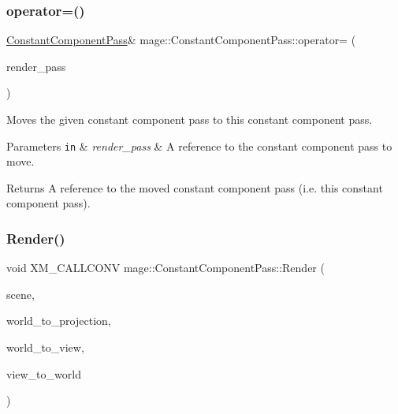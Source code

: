 \subsubsection{\texorpdfstring{operator=()}{operator=()}\hspace{0.1cm}{\footnotesize\ttfamily [2/2]}}
{\footnotesize\ttfamily \hyperlink{classmage_1_1_constant_component_pass}{Constant\+Component\+Pass}\& mage\+::\+Constant\+Component\+Pass\+::operator= (\begin{DoxyParamCaption}\item[{\hyperlink{classmage_1_1_constant_component_pass}{Constant\+Component\+Pass} \&\&}]{render\+\_\+pass }\end{DoxyParamCaption})\hspace{0.3cm}{\ttfamily [delete]}}

Moves the given constant component pass to this constant component pass.


\begin{DoxyParams}[1]{Parameters}
\mbox{\tt in}  & {\em render\+\_\+pass} & A reference to the constant component pass to move. \\
\hline
\end{DoxyParams}
\begin{DoxyReturn}{Returns}
A reference to the moved constant component pass (i.\+e. this constant component pass). 
\end{DoxyReturn}
\hypertarget{classmage_1_1_constant_component_pass_a8650124f2a85ab18e56d2058305ad008}{}\label{classmage_1_1_constant_component_pass_a8650124f2a85ab18e56d2058305ad008} 
\subsubsection{\texorpdfstring{Render()}{Render()}}
{\footnotesize\ttfamily void X\+M\+\_\+\+C\+A\+L\+L\+C\+O\+NV mage\+::\+Constant\+Component\+Pass\+::\+Render (\begin{DoxyParamCaption}\item[{const \hyperlink{classmage_1_1_scene}{Scene} \&}]{scene,  }\item[{F\+X\+M\+M\+A\+T\+R\+IX}]{world\+\_\+to\+\_\+projection,  }\item[{C\+X\+M\+M\+A\+T\+R\+IX}]{world\+\_\+to\+\_\+view,  }\item[{C\+X\+M\+M\+A\+T\+R\+IX}]{view\+\_\+to\+\_\+world }\end{DoxyParamCaption})}

